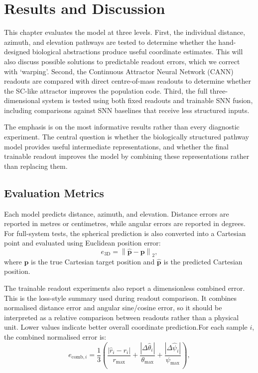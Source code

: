 \chapter{Results and Discussion} \label{ch:results}

This chapter evaluates the model at three levels. First, the individual distance, azimuth, and elevation pathways are tested to determine whether the hand-designed biological abstractions produce useful coordinate estimates. This will also discuss possible solutions to predictable readout errors, which we correct with `warping'. Second, the Continuous Attractor Neural Network (CANN) readouts are compared with direct centre-of-mass readouts to determine whether the SC-like attractor improves the population code. Third, the full three-dimensional system is tested using both fixed readouts and trainable SNN fusion, including comparisons against SNN baselines that receive less structured inputs.

The emphasis is on the most informative results rather than every diagnostic experiment. The central question is whether the biologically structured pathway model provides useful intermediate representations, and whether the final trainable readout improves the model by combining these representations rather than replacing them.

\section{Evaluation Metrics}

Each model predicts distance, azimuth, and elevation. Distance errors are reported in metres or centimetres, while angular errors are reported in degrees. For full-system tests, the spherical prediction is also converted into a Cartesian point and evaluated using Euclidean position error:
\begin{equation}
    e_{\mathrm{3D}}
    =
    \left\|
        \hat{\mathbf{p}} - \mathbf{p}
    \right\|_2 ,
\end{equation}
where $\mathbf{p}$ is the true Cartesian target position and $\hat{\mathbf{p}}$ is the predicted Cartesian position.

The trainable readout experiments also report a dimensionless combined error. This is the loss-style summary used during readout comparison. It combines normalised distance error and angular sine/cosine error, so it should be interpreted as a relative comparison between readouts rather than a physical unit. Lower values indicate better overall coordinate prediction.For each sample $i$, the combined normalised error is:
\begin{equation}
    e_{\mathrm{comb},i}
    =
    \frac{1}{3}
    \left(
        \frac{|\hat{r}_i-r_i|}{r_{\max}}
        +
        \frac{|\Delta \hat{\theta}_i|}{\theta_{\max}}
        +
        \frac{|\Delta \hat{\psi}_i|}{\psi_{\max}}
    \right),
\end{equation}



